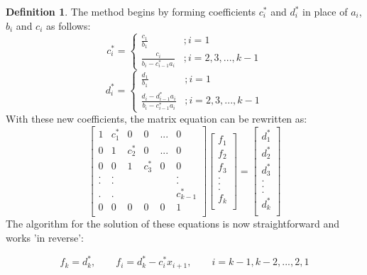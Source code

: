 \documentclass[12pt, oneside]{book}
\theoremstyle{plain}
\theoremstyle{definition}
\newtheorem{definition}[theorem]{Definition}
\begin{document}
\begin{definition}
The method begins by forming coefficients \(c^{*}_i\) and \(d^{*}_i\) in place of \(a_i\), \(b_i\) and \(c_i\) as follows:
$$
c^{*}_i = \left\{
     \begin{array}{lr}
       \frac{c_1}{b_1} & ; i = 1\\
       \frac{c_i}{b_i - c^{*}_{i-1} a_i} & ; i = 2,3,...,k-1
     \end{array}
   \right.
$$
$$   
d^{*}_i = \left\{
     \begin{array}{lr}
       \frac{d_1}{b_1} & ; i = 1\\
       \frac{d_i-d^{*}_{i-1} a_i}{b_i - c^{*}_{i-1} a_i} & ; i = 2,3,...,k-1
     \end{array}
   \right.
   $$
With these new coefficients, the matrix equation can be rewritten as:
$$
\begin{bmatrix}  
1 & c^{*}_1 & 0 & 0 & ... & 0 \\ 
0 & 1 & c^{*}_2 & 0 & ... & 0 \\ 
0 & 0 & 1 & c^{*}_3 & 0 & 0 \\ 
. & . &  &  &  & . \\ 
. & . &  &  &  & . \\ 
. & . &  &  &  & c^{*}_{k-1} \\ 
0 & 0 & 0 & 0 & 0 & 1 \\ 
\end{bmatrix} \begin{bmatrix}  
f_1 \\ 
f_2 \\ 
f_3 \\ 
.\\ 
.\\ 
.\\ 
f_k \\ 
\end{bmatrix} = \begin{bmatrix} 
d^{*}_1 \\ 
d^{*}_2 \\ 
d^{*}_3 \\ 
.\\ 
.\\ 
.\\ 
d^{*}_k \\ 
\end{bmatrix}
$$
The algorithm for the solution of these equations is now straightforward and works 'in reverse':

\[ f_k = d^{*}_k, \qquad f_i = d^{*}_k - c^{*}_i x_{i+1}, \qquad i = k-1, k-2, ... ,2,1 \]

\end{definition}
\end{document}
